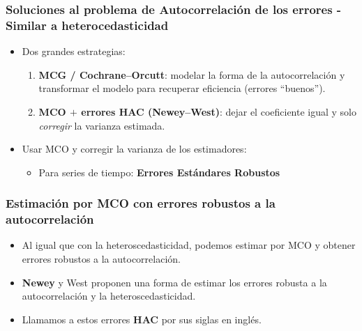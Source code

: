 \documentclass{beamer}
\begin{document}
\begin{frame}
\frametitle{Soluciones al problema de Autocorrelación de los errores - Similar a heterocedasticidad}

\begin{itemize}
  \item Dos grandes estrategias:
  \begin{enumerate}
    \item \textbf{MCG / Cochrane--Orcutt}: modelar la forma de la autocorrelación y transformar el modelo para recuperar eficiencia (errores ``buenos'').
    \item \textbf{MCO $+$ errores HAC (Newey--West)}: dejar el coeficiente igual y solo \emph{corregir} la varianza estimada.
  \end{enumerate}
  \item Usar MCO y corregir la varianza de los estimadores:
  \begin{itemize}
    \item Para series de tiempo:\textbf{ Errores Estándares Robustos}
  \end{itemize}
\end{itemize}

\end{frame}
\begin{frame}
\frametitle{Estimación por MCO con errores robustos a la autocorrelación}

\begin{itemize}
  \item Al igual que con la heteroscedasticidad, podemos estimar por MCO y obtener errores robustos a la autocorrelación.
  \item \textbf{Newey} y West proponen una forma de estimar los errores robusta a la autocorrelación y la heteroscedasticidad.
  \item Llamamos a estos errores \textbf{HAC} por sus siglas en inglés.
\end{itemize}

\end{frame}
\end{document}
